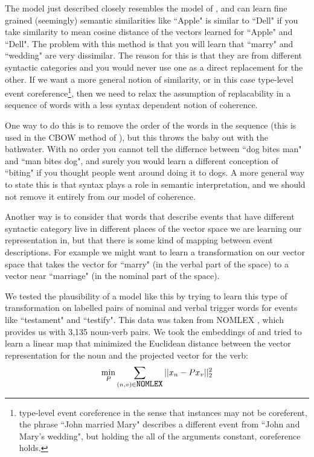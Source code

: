 \documentclass[11pt,letterpaper]{article}
\begin{document}
The model just described closely resembles the model of \cite{rami}, and
can learn fine grained (seemingly) semantic similarities like ``Apple" is
similar to ``Dell" if you take similarity to mean cosine distance of the
vectors learned for ``Apple" and ``Dell".
The problem with this method is that you will learn that ``marry" and
``wedding" are very dissimilar. The reason for this is that they are from
different syntactic categories and you would never use one as a direct replacement
for the other.
If we want a more general notion of similarity, or in this case type-level event
coreference\footnote{type-level event coreference in the sense that instances may
not be coreferent, the phrase ``John married Mary" describes a different event from
``John and Mary's wedding", but holding the all of the arguments constant, coreference holds.},
then we need to relax the assumption of replacability in a sequence of words with
a less syntax dependent notion of coherence.

One way to do this is to remove the order of the words in the sequence
(this is used in the CBOW method of \cite{DBLP:journals/corr/abs-1301-3781}),
but this throws the baby out with the bathwater. With no order you cannot
tell the differnce between ``dog bites man" and ``man bites dog", and surely
you would learn a different conception of ``biting" if you thought people went
around doing it to dogs.
A more general way to state this is that syntax plays a role in semantic interpretation,
and we should not remove it entirely from our model of coherence.

Another way is to consider that words that describe events that have
different syntactic category live in different places of the vector space
we are learning our representation in, but that there is some kind of mapping
between event descriptions. For example we might want to learn a transformation
on our vector space that takes the vector for ``marry" (in the verbal part
of the space) to a vector near ``marriage" (in the nominal part of the space).

We tested the plausibility of a model like this by trying to learn this type
of transformation on labelled pairs of nominal and verbal trigger words for events
like ``testament" and ``testify". This data was taken from NOMLEX \cite{nomlex},
which provides us with 3,135 noun-verb pairs.
We took the embeddings of \cite{rami} and tried to learn a linear map that minimized
the Euclidean distance between the vector representation for the noun and the
projected vector for the verb:
\[
	\min_P \sum_{(n,v) \in \mbox{\texttt{NOMLEX}}}
		|| x_n - P x_v ||_2^2
\]
\end{document}
